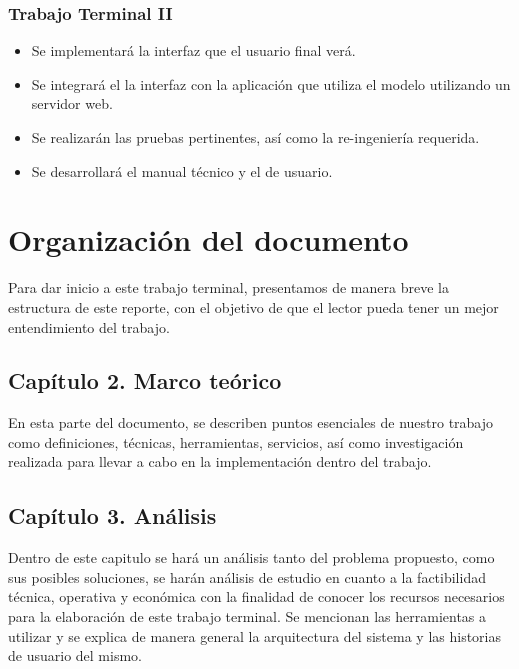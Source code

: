 \documentclass[12pt, a4paper, titlepage]{report}
\begin{document}
    	\subsubsection*{Trabajo Terminal II}
    	\begin{itemize}
    		\item Se implementará la interfaz que el usuario final verá.
    		\item Se integrará el la interfaz con la aplicación que utiliza el modelo utilizando un servidor web.
    		\item Se realizarán las pruebas pertinentes, así como la re-ingeniería requerida.
    		\item Se desarrollará el manual técnico y el de usuario.
    	\end{itemize}
    
	    \newpage
        \section{Organización del documento}
            Para dar inicio a este trabajo terminal, presentamos de manera breve la estructura de este reporte, con el objetivo de que el lector pueda tener un mejor entendimiento del trabajo.

            \subsection*{Capítulo 2. Marco teórico}
                En esta parte del documento, se describen puntos esenciales de nuestro trabajo como definiciones, técnicas, herramientas, servicios, así como investigación realizada para llevar a cabo en la implementación dentro del trabajo. 
             
            \subsection*{Capítulo 3. Análisis}
                Dentro de este capitulo se hará un análisis tanto del problema propuesto, como sus posibles soluciones, se harán análisis de estudio en cuanto a la factibilidad técnica, operativa y económica con la finalidad de conocer los recursos necesarios para la elaboración de este trabajo terminal. Se mencionan las herramientas a utilizar y se explica de manera general la arquitectura del sistema y las historias de usuario del mismo.
             
\end{document}
